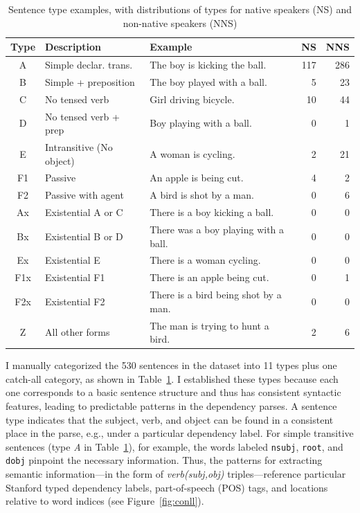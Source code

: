 \begin{table}[htb!]
\begin{center}
\begin{tabular}{|c|l|l|r|r|}
\hline
Type & Description & Example & NS & NNS \\
\hline
 A & Simple declar. trans. & The boy is kicking the ball. & 117 & 286 \\
 \hline
 B & Simple + preposition & The boy played with a ball. & 5 & 23 \\
 \hline
 C & No tensed verb & Girl driving bicycle. & 10 & 44 \\
 \hline
 D & No tensed verb + prep & Boy playing with a ball. & 0 & 1 \\
 \hline
 E & Intransitive (No object) & A woman is cycling. & 2 & 21 \\
 \hline
 F1 & Passive & An apple is being cut. & 4 & 2 \\
 \hline
 F2 & Passive with agent & A bird is shot by a man. & 0 & 6 \\
 \hline
 Ax & Existential A or C & There is a boy kicking a ball. & 0 & 0 \\
 \hline
 Bx & Existential B  or D & There was a boy playing with a ball. & 0 & 0 \\
 \hline
 Ex & Existential E & There is a woman cycling. & 0 & 0 \\
 \hline
 F1x & Existential F1 & There is an apple being cut. & 0 & 1 \\
 \hline
 F2x & Existential F2 & There is a bird being shot by a man. & 0 & 0 \\
 \hline
 Z & All other forms & The man is trying to hunt a bird. & 2 & 6 \\
 \hline
\end{tabular}
\end{center}
\caption{Sentence type examples, with distributions of types for
  native speakers (NS) and non-native speakers (NNS)}
\label{tab:sentence-type}
\end{table}


I manually categorized the 530 sentences in the dataset into 11 types plus one catch-all category, as shown in
Table~\ref{tab:sentence-type}. I established these types because each
one corresponds to a basic sentence structure and thus has consistent
syntactic features, leading to predictable patterns in the dependency
parses. A sentence type indicates that the subject,
verb, and object can be found in a consistent place in the parse,
e.g., under a particular dependency label.
For simple transitive sentences (type \textit{A} in Table~\ref{tab:sentence-type}), for example, the words labeled {\tt nsubj}, {\tt root}, and {\tt dobj} 
pinpoint the necessary information.
Thus, the patterns for extracting semantic information---in the form
of \textit{verb(subj,obj)} triples---reference particular Stanford
typed dependency labels, part-of-speech (POS) tags, and locations
relative to word indices (see Figure~\ref{fig:conll}).


